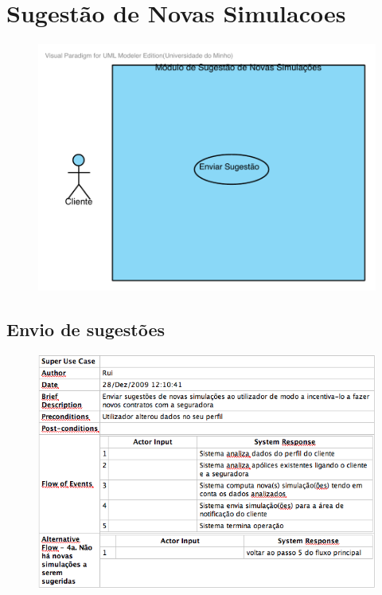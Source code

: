 \pagebreak



\section{Sugestão de Novas Simulacoes}
\begin{figure}[!htb]
	\centering
	\includegraphics[scale=0.6]{images/Prints/SugestaoNovasSimulacoes/SugestaoNovasSimulacoes.pdf}
\end{figure}

\subsection{Envio de sugestões}
\begin{figure}[!htb]
	\centering
	\includegraphics[scale=0.6]{images/Prints/SugestaoNovasSimulacoes/EnviarSugestao.png}
\end{figure}

